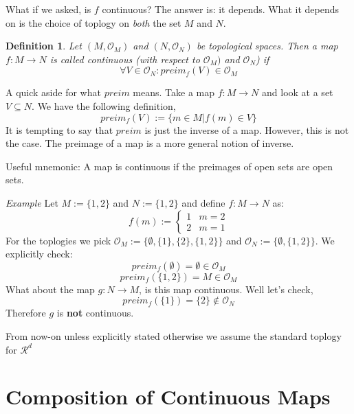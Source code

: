 \documentclass{article}
\newtheorem{definition}{Definition}
\begin{document}
	\noindent What if we asked, is $f$ continuous? The answer is: it depends. What it
	depends on is the choice of toplogy on \textit{both} the set $M$ and $N$.
	\begin{definition}
		Let $(M,\mathscr{O}_M)$ and $(N,\mathscr{O}_N)$ be topological spaces. Then a 
		map $f:M\longrightarrow N$ is called continuous (with respect to $\mathscr{O}_M)$
		and $\mathscr{O}_N$) if
		$$ \forall V\in \mathscr{O}_N : preim_f(V) \in \mathscr{O}_M$$
	\end{definition}
	\noindent A quick aside for what $preim$ means. Take a map $f:M\longrightarrow N$ and look
	at a set $V\subseteq N$. We have the following definition,
	$$ preim_f(V) := \{m\in M | f(m) \in V\}$$
	It is tempting to say that $preim$ is just the inverse of a map. However,
	this is not the case. The preimage of a map is a more general notion of inverse.

	\noindent Useful mnemonic: A map is continuous if the preimages of open sets
	are open sets.

	\noindent\textit{Example} Let $M:=\{1,2\}$ and $N:=\{1,2\}$ and define
	$f:M\longrightarrow N$ as:
	$$ f(m):=
	\begin{cases}
		1 & m=2 \\
		2 & m=1 
	\end{cases}
	$$
	For the toplogies we pick $\mathscr{O}_M:=\{\emptyset, \{1\}, \{2\}, \{1,2\}\}$ 
	and $\mathscr{O}_N:=\{\emptyset, \{1,2\}\}$. We explicitly check:
	$$ preim_f(\emptyset) = \emptyset\in\mathscr{O}_M $$ 
	$$ preim_f(\{1,2\}) = M \in\mathscr{O}_M $$
	What about the map $g:N\longrightarrow M$, is this map continuous. Well
	let's check,
	$$ preim_f(\{1\}) = \{2\}\notin \mathscr{O}_N$$
	Therefore $g$ is \textbf{not} continuous.

	\noindent From now-on unless explicitly stated otherwise we assume the standard
	toplogy for $\mathscr{R}^d$

	\section{Composition of Continuous Maps}

	
	
\end{document}
